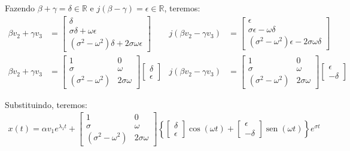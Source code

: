 \documentclass[11pt]{article}
\DeclareMathOperator{\sen}{sen}
\begin{document}
Fazendo $\beta + \gamma = \delta \in \mathbb{R}$ e $j(\beta - \gamma) = \epsilon \in \mathbb{R}$, teremos:
\begin{align*}
  \beta v_2 + \gamma v_3 &=
  \begin{bmatrix}
    \delta\\
    \sigma \delta + \omega \epsilon\\
    (\sigma^2 - \omega^2) \delta + 2 \sigma \omega \epsilon
  \end{bmatrix}
  &
  j(\beta v_2 - \gamma v_3) &=
  \begin{bmatrix}
    \epsilon\\
    \sigma \epsilon - \omega \delta\\
    (\sigma^2 - \omega^2) \epsilon - 2 \sigma \omega \delta
  \end{bmatrix}\\ %
  \beta v_2 + \gamma v_3 &=
  \begin{bmatrix}
    1 & 0\\
    \sigma & \omega\\
    (\sigma^2 - \omega^2) & 2 \sigma \omega
  \end{bmatrix}
  \begin{bmatrix}
    \delta\\
    \epsilon
  \end{bmatrix}
  &
  j(\beta v_2 - \gamma v_3) &=
  \begin{bmatrix}
    1 & 0\\
    \sigma & \omega\\
    (\sigma^2 - \omega^2) & 2 \sigma \omega
  \end{bmatrix}
  \begin{bmatrix}
    \epsilon\\
    -\delta
  \end{bmatrix}
\end{align*}

Substituindo, teremos:
\begin{align*}
  x(t) = \alpha v_1 e^{\lambda_1 t} +
  \begin{bmatrix}
    1 & 0\\
    \sigma & \omega\\
    (\sigma^2 - \omega^2) & 2 \sigma \omega
  \end{bmatrix}
  \left\{
    \begin{bmatrix}
      \delta\\
      \epsilon
    \end{bmatrix}
    \cos(\omega t) +
    \begin{bmatrix}
      \epsilon\\
      -\delta
    \end{bmatrix}
    \sen(\omega t)
  \right\}
  e^{\sigma t}
\end{align*}
\end{document}
